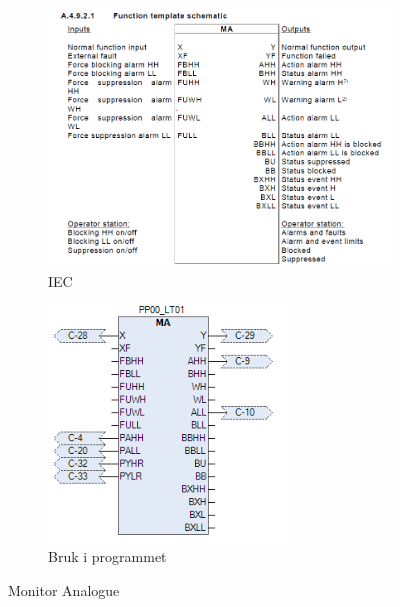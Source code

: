 \begin{figure}[htbp]
    \centering
    \begin{subfigure}[b]{0.45\textwidth}
        \centering
        \includegraphics[width=1\textwidth]{Bilder/MABlokkIEC.png}
        \caption{IEC}\label{fig:Monitor Analogue blokk IEC}
    \end{subfigure}
    \hfill
    \begin{subfigure}[b]{0.45\textwidth}
        \centering
        \includegraphics[width=0.7\textwidth]{Bilder/MABlokkIProgrammet.png}
        \caption{Bruk i programmet}\label{fig:Monitor Analogue blokk i programmet}
    \end{subfigure}
    \caption{Monitor Analogue}\label{fig:Monitor Analogue}
\end{figure}


